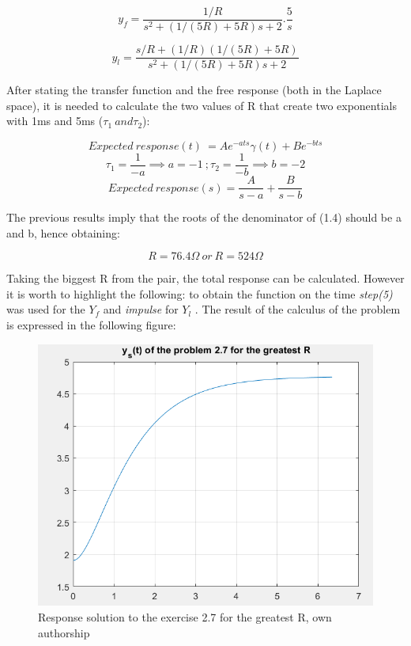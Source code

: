 \documentclass[a4paper,12pt]{article}
\begin{document}
\begin{equation}
    y_f = \frac{1/R}{s^2 + (1/(5R) + 5R)s + 2} . \frac{5}{s}
\end{equation}

\begin{equation}
    y_l = \frac{s/R + (1/R)(1/(5R) + 5R)}{s^2 + (1/(5R) + 5R)s + 2}
\end{equation}

\vspace{0.5cm}

After stating the transfer function and the free response (both in the Laplace space), it is needed to calculate the two values of R that create two exponentials with 1ms and 5ms (\(\tau_1 \ and \tau_2\)):

\vspace{0.5cm}

\[ Expected \ response(t) \ = Ae^{-ats}\gamma(t) + Be^{-bts} \]
\[\tau_1 = \frac{1}{-a} \implies a = -1 \ ; \tau_2 = \frac{1}{-b} \implies b = -2\]
\[Expected \ response(s) = \frac{A}{s-a} + \frac{B}{s-b}\]

\vspace{0.5cm}

The previous results imply that the roots of the denominator of (1.4) should be a and b, hence obtaining:

\vspace{0.5cm}

\[R = 76.4\Omega \ or \ R = 524\Omega\]

\newpage

Taking the biggest R from the pair, the total response can be calculated. However it is worth to highlight the following: to obtain the function on the time \textit{step(5)} was used for the \(Y_f\) and \textit{impulse} for \(Y_l\) . The result of the calculus of the problem is expressed in the following figure:

\vspace{0.5cm}

\begin{figure}[H]
    \centering
    \includegraphics[width=0.35\linewidth]{fonts_lab_1/solution.png}
    \caption{Response solution to the exercise 2.7 for the greatest R, own authorship}
    \label{fig:2-7-sol-response}
\end{figure}
\end{document}
